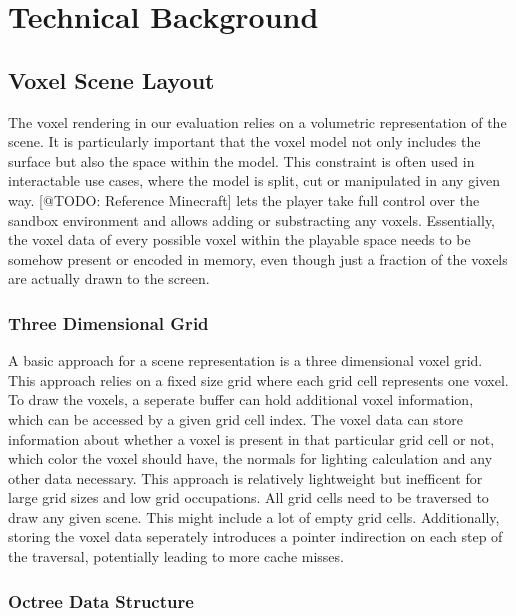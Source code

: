 \chapter{Technical Background} \label{cpt-technical-background}

\section{Voxel Scene Layout}

The voxel rendering in our evaluation relies on a volumetric representation of the scene.
It is particularly important that the voxel model not only includes the surface but also 
the space within the model. This constraint is often used in interactable use cases, where 
the model is split, cut or manipulated in any given way. [@TODO: Reference Minecraft] lets
the player take full control over the sandbox environment and allows adding or substracting 
any voxels. Essentially, the voxel data of every possible voxel within the playable space 
needs to be somehow present or encoded in memory, even though just a fraction of the voxels 
are actually drawn to the screen.\\

\subsection{Three Dimensional Grid} \label{subsec-three-dimensional-grid}

A basic approach for a scene representation is a three dimensional voxel grid. This 
approach relies on a fixed size grid where each grid cell represents one voxel.
To draw the voxels, a seperate buffer can hold additional voxel information, which 
can be accessed by a given grid cell index. The voxel data can store information about 
whether a voxel is present in that particular grid cell or not, which color the voxel 
should have, the normals for lighting calculation and any other data necessary.
This approach is relatively lightweight but inefficent for large grid sizes and low 
grid occupations. All grid cells need to be traversed to draw any given scene. This 
might include a lot of empty grid cells. Additionally, storing the voxel data seperately
introduces a pointer indirection on each step of the traversal, potentially leading to more 
cache misses.

\subsection{Octree Data Structure} \label{subsec-octree-data-structure}


